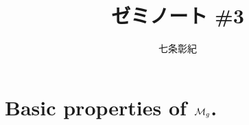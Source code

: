 \documentclass[a4paper]{jsarticle}
\newcommand{\tp}[2]{\texorpdfstring{#1}{#2}}
\begin{document}
\title{ゼミノート \#3}
\author{七条彰紀}
\maketitle
\section{Basic properties of \tp{$\mathcal{M}_g$}{Mg}.}
    


\end{document}
